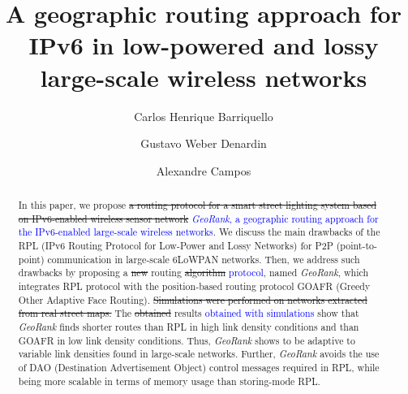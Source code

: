\documentclass[final,authoryear,3p,twocolumn]{elsarticle}
\newcommand{\rev}{\textcolor{blue}}
\begin{document}
\begin{frontmatter}



\title{A geographic routing approach for IPv6 in low-powered and lossy large-scale wireless networks}



\author[addr1]{Carlos Henrique Barriquello}
\author[addr2]{Gustavo Weber Denardin}
\author[addr1]{Alexandre Campos}
\address[addr1]{Electronic Ballast Researching Group (GEDRE) - Intelligence in Lighting, Federal University of Santa Maria(UFSM), Santa Maria, RS, 97105-900, Brazil}
\address[addr2]{Technological Federal University of Paran$\acute{a}$, Pato Branco, PR, 85503-390, Brazil}


\begin{abstract}
In this paper, we propose \sout{a routing protocol for a smart street lighting system based on IPv6-enabled wireless sensor network} \rev{\textit{GeoRank}, a geographic routing approach for the IPv6-enabled large-scale  wireless networks}. We discuss the main drawbacks of the RPL (IPv6 Routing Protocol for
Low-Power and Lossy Networks) for P2P (point-to-point) communication in large-scale 6LoWPAN networks. Then, we address such drawbacks by proposing a \sout{new} routing \sout{algorithm} \rev{protocol}, named \textit{GeoRank}, which integrates RPL protocol with the position-based routing protocol GOAFR (Greedy Other Adaptive Face Routing). \sout{Simulations were performed on networks extracted from real street maps.} The \sout{obtained} results \rev{obtained with simulations} show that \textit{GeoRank} finds shorter routes than RPL in high link density conditions and than GOAFR in low link density conditions. Thus, \textit{GeoRank} shows to be adaptive to variable link densities found in large-scale networks. Further, \textit{GeoRank} avoids the use of DAO (Destination Advertisement Object) control messages required in RPL, while being more scalable in terms of memory usage than storing-mode RPL.
\end{abstract}



\end{frontmatter}
\end{document}
